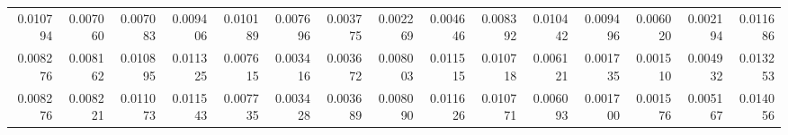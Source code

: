 \begin{tabular}{rrrrrrrrrrrrrrr}
0.010794 & 0.007060 & 0.007083 & 0.009406 & 0.010189 & 0.007696 & 0.003775 & 0.002269 & 0.004646 & 0.008392 & 0.010442 & 0.009496 & 0.006020 & 0.002194 & 0.011686 \\
0.008276 & 0.008162 & 0.010895 & 0.011325 & 0.007615 & 0.003416 & 0.003672 & 0.008003 & 0.011515 & 0.010718 & 0.006121 & 0.001735 & 0.001510 & 0.004932 & 0.013253 \\
0.008276 & 0.008221 & 0.011073 & 0.011543 & 0.007735 & 0.003428 & 0.003689 & 0.008090 & 0.011626 & 0.010771 & 0.006093 & 0.001700 & 0.001576 & 0.005167 & 0.014056 \\
\bottomrule
\end{tabular}

